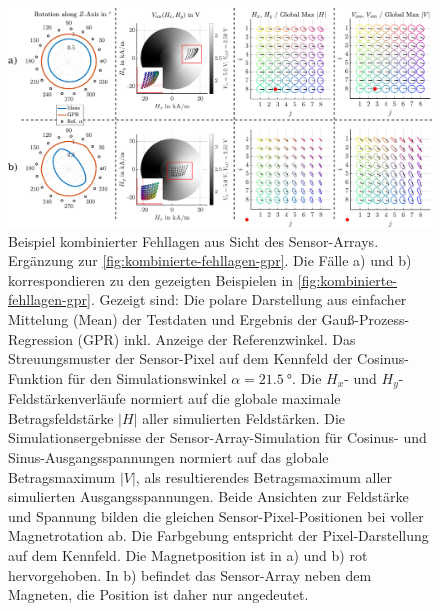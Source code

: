 \clearpage
\begin{figure}[tph]
	\centering
	\includegraphics[width=\linewidth]{chapters/images/4-EuOExp/Kombinierte-Fehllagen-Sensor}
	\caption[Beispiel kombinierter Fehllagen aus Sicht des Sensor-Arrays]{Beispiel kombinierter Fehllagen aus Sicht des Sensor-Arrays. Ergänzung zur \autoref{fig:kombinierte-fehllagen-gpr}. Die Fälle a) und b) korrespondieren zu den gezeigten Beispielen in \autoref{fig:kombinierte-fehllagen-gpr}. Gezeigt sind: Die polare Darstellung aus einfacher Mittelung (Mean) der Testdaten und Ergebnis der Gauß-Prozess-Regression (GPR) inkl. Anzeige der Referenzwinkel. Das Streuungsmuster der Sensor-Pixel auf dem Kennfeld der Cosinus-Funktion für den Simulationswinkel $\alpha = \SI{21,5}{\degree}$. Die $H_x$- und $H_y$-Feldstärkenverläufe normiert auf die globale maximale Betragsfeldstärke $|H|$ aller simulierten Feldstärken. Die Simulationsergebnisse der Sensor-Array-Simulation für Cosinus- und Sinus-Ausgangsspannungen normiert auf das globale Betragsmaximum $|V|$, als resultierendes Betragsmaximum aller simulierten Ausgangsspannungen. Beide Ansichten zur Feldstärke und Spannung bilden die gleichen Sensor-Pixel-Positionen  bei voller Magnetrotation ab. Die Farbgebung entspricht der Pixel-Darstellung auf dem Kennfeld. Die Magnetposition ist in a) und b) rot hervorgehoben. In b) befindet das Sensor-Array neben dem Magneten, die Position ist daher nur angedeutet.}
	\label{fig:kombinierte-fehllagen-sensor}
\end{figure}	


\clearpage

